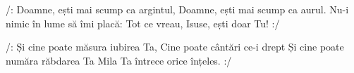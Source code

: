 
\beginchorus
/: Doamne, ești mai scump ca argintul,
Doamne, ești mai scump ca aurul.
Nu-i nimic în lume să îmi placă:
Tot ce vreau, Isuse, ești doar Tu! :/
\endchorus

\beginverse
/: Și cine poate măsura iubirea Ta,
Cine poate cântări ce-i drept
Și cine poate număra răbdarea Ta
Mila Ta întrece orice înțeles. :/
\endverse

\endsong